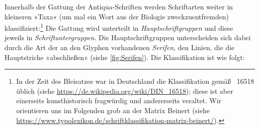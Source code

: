 Innerhalb der Gattung der Antiqua-Schriften werden Schriftarten weiter
in kleineren »Taxa« (um mal ein Wort aus der Biologie
zweckzuentfremden) klassifiziert:\footnote{In der Zeit des Bleisatzes
  war in Deutschland die Klassifikation gemäß ~16518 üblich
  (siehe \url{https://de.wikipedia.org/wiki/DIN_16518}); diese ist
  aber einerseits kunsthistorisch fragwürdig und andererseits
  veraltet.  Wir orientieren uns im Folgenden grob an der Matrix
  Beinert (siehe
  \url{https://www.typolexikon.de/schriftklassifikation-matrix-beinert/}).}
Die Gattung wird unterteilt in \emph{Hauptschriftgruppen} und diese
jeweils in \emph{Schriftuntergruppen}.  Die Hauptschriftgruppen
unterscheiden sich dabei durch die Art der an den Glyphen vorhandenen
\emph{Serifen}, den Linien, die die Hauptstriche »abschließen« (siehe
\cref{fig:Serifen}).  Die Klassifikation ist wie folgt:
